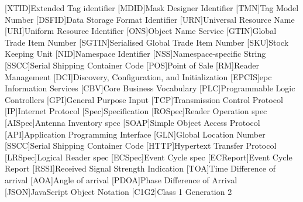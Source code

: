 \begin{multicols}{2}
\begin{acronym}[AAAAAA]
	[XTID]{Extended Tag identifier}
	[MDID]{Mask Designer Identifier}
	[TMN]{Tag Model Number}
	[DSFID]{Data Storage Format Identifier}
	[URN]{Universal Resource Name}
	[URI]{Uniform Resource Identifier}
	[ONS]{Object Name Service}
	[GTIN]{Global Trade Item Number}
	[SGTIN]{Serialised Global Trade Item Number}
	[SKU]{Stock Keeping Unit}
	[NID]{Namespace Identifier}
	[NSS]{Namespace-specific String}
	[SSCC]{Serial Shipping Container Code}
	[POS]{Point of Sale}
	[RM]{Reader Management}
	[DCI]{Discovery, Configuration, and 
	Initialization}
	[EPCIS]{\ac{epc} Information Services}
	[CBV]{Core Business Vocabulary}
	[PLC]{Programmable Logic Controllers}
	[GPI]{General Purpose Input}
	[TCP]{Transmission Control Protocol}
	[IP]{Internet Protocol}
	[Spec]{Specification}
	[ROSpec]{Reader Operation \acs{spec}}
	[AISpec]{Antenna Inventory \acs{spec}}
	[SOAP]{Simple Object Access Protocol}
	[API]{Application Programming Interface}
	[GLN]{Global Location Number}
	[SSCC]{Serial Shipping Container Code}
	[HTTP]{Hypertext Transfer Protocol}
	[LRSpec]{Logical Reader \ac{spec}}
	[ECSpec]{Event Cycle \ac{spec}}
	[ECReport]{Event Cycle Report}
	[RSSI]{Received Signal Strength Indication}
	[TOA]{Time Difference of arrival}
	[AOA]{Angle of arrival}
	[PDOA]{Phase Difference of Arrival}
	[JSON]{JavaScript Object Notation}
	[C1G2]{Class 1 Generation 2}
\end{acronym}
\end{multicols}

